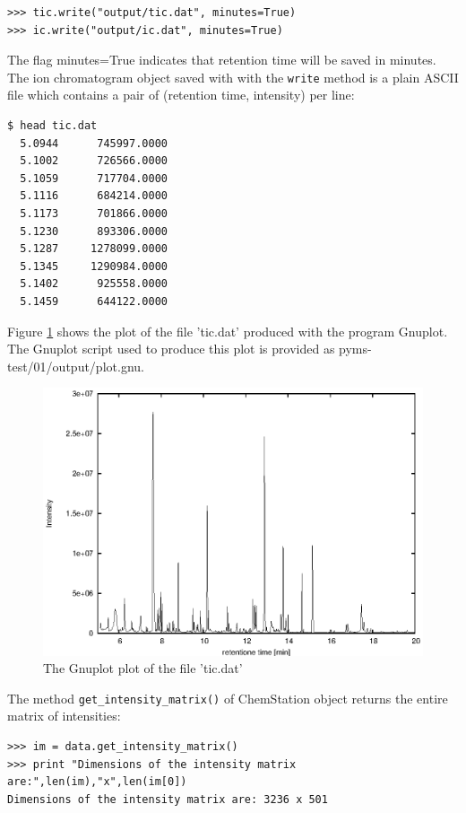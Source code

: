 \begin{verbatim}
>>> tic.write("output/tic.dat", minutes=True)
>>> ic.write("output/ic.dat", minutes=True)
\end{verbatim}

\noindent
The flag minutes=True indicates that retention time will be saved in minutes.
The ion chromatogram object saved with with the {\tt write{}} method is a
plain ASCII file which contains a pair of (retention time, intensity) per
line:

\begin{verbatim}
$ head tic.dat
  5.0944      745997.0000
  5.1002      726566.0000
  5.1059      717704.0000
  5.1116      684214.0000
  5.1173      701866.0000
  5.1230      893306.0000
  5.1287     1278099.0000
  5.1345     1290984.0000
  5.1402      925558.0000
  5.1459      644122.0000
\end{verbatim}

\noindent
Figure \ref{fig:tic-plot} shows the plot of the file 'tic.dat' produced with the
program Gnuplot. The Gnuplot script used to produce this plot is provided
as pyms-test/01/output/plot.gnu.

\begin{figure}[htp]
\begin{center}
\includegraphics{graphics/pyms-test/tic.eps}
\caption{The Gnuplot plot of the file 'tic.dat'}
\label{fig:tic-plot}
\end{center}
\end{figure}

The method {\tt get\_intensity\_matrix()} of ChemStation object returns
the entire matrix of intensities:

\begin{verbatim}
>>> im = data.get_intensity_matrix()
>>> print "Dimensions of the intensity matrix are:",len(im),"x",len(im[0])
Dimensions of the intensity matrix are: 3236 x 501
\end{verbatim}

